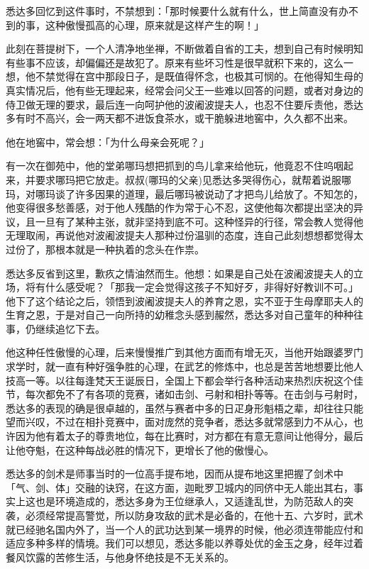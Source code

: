 \documentclass[12pt,twoside,openany]{book}
\begin{document}
悉达多回忆到这件事时，不禁想到：「那时候要什么就有什么，世上简直没有办不到的事，这种傲慢孤高的心理，原来就是这样产生的啊！」

此刻在菩提树下，一个人清净地坐禅，不断做着自省的工夫，想到自己有时候明知有些事不应该，却偏偏还是故犯了。原来有些坏习性是很早就积下来的，这么一想，他不禁觉得在宫中那段日子，是既值得怀念，也极其可悯的。在他得知生母的真实情况后，他有些无理起来，经常会问父王一些难以回答的问题，或者对身边的侍卫做无理的要求，最后连一向呵护他的波阇波提夫人，也忍不住要斥责他，悉达多有时不高兴，会一两天都不进饭食茶水，或干脆躲进地窖中，久久都不出来。

他在地窖中，常会想：「为什么母亲会死呢？」

有一次在御苑中，他的堂弟哪玛想把抓到的鸟儿拿来给他玩，他竟忍不住呜咽起来，并要求哪玛把它放走。叔叔(哪玛的父亲)见悉达多哭得伤心，就帮着说服哪玛，对哪玛谈了许多因果的道理，最后哪玛被说动了才把鸟儿给放了。不知怎的，他变得很多愁善感，对于他人残酷的作为常于心不忍，这使他每次都提出坚决的异议，且一旦有了某种主张，就非坚持到底不可。这种怪异的行径，常会教人觉得他无理取闹，再说他对波阇波提夫人那种过份温驯的态度，连自己此刻想想都觉得太过份了，那根本就是一种执着的念头在作祟。

悉达多反省到这里，歉疚之情油然而生。他想：如果是自己处在波阇波提夫人的立场，将有什么感受呢？「那我一定会觉得这孩子不知好歹，非得好好教训不可。」他下了这个结论之后，领悟到波阇波提夫人的养育之恩，实不亚于生母摩耶夫人的生育之恩，于是对自己一向所持的幼稚念头感到赧然，悉达多对自己童年的种种往事，仍继续追忆下去。

他这种任性傲慢的心理，后来慢慢推广到其他方面而有增无灭，当他开始跟婆罗门求学时，就一直有种好强争胜的心理，在武艺的修炼中，也总是苦苦地想要比他人技高一等。以往每逢梵天王诞辰日，全国上下都会举行各种活动来热烈庆祝这个佳节，每次都免不了有各项的竞赛，诸如击剑、弓射和相扑等等。在击剑与弓射时，悉达多的表现的确是很卓越的，虽然与赛者中多的日疋身形魁梧之辈，却往往只能望而兴叹，不过在相扑竞赛中，面对庞然的竞争者，悉达多就常感到力不从心，也许因为他有着太子的尊贵地位，每在比赛时，对方都在有意无意间让他得分，最后让他夺魁，在这种每战必胜的情况下，更增长了他的傲慢心。

悉达多的剑术是师事当时的一位高手提布地，因而从提布地这里把握了剑术中「气、剑、体」交融的诀窍，在这方面，迦毗罗卫城内的同侪中无人能出其右，事实上这也是环境造成的，悉达多身为王位继承人，又适逢乱世，为防范敌人的突袭，必须经常提高警觉，所以防身攻敌的武术是必备的，在他十五、六岁时，武术就已经驰名国内外了，当一个人的武功达到某一境界的时候，他必须连带能应付和适应多种多样的情境。我们可以想见，悉达多能以养尊处优的金玉之身，经年过着餐风饮露的苦修生活，与他身怀绝技是不无关系的。
\end{document}
